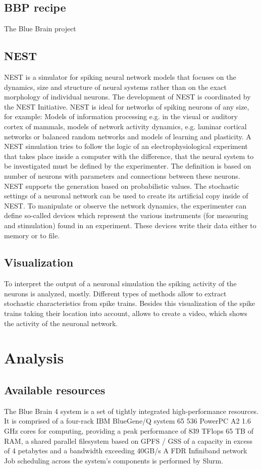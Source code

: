 \documentclass[a4paper]{article}
\begin{document}
\subsection{BBP recipe}
	The Blue Brain project   

\subsection{NEST}
NEST is a simulator for spiking neural network models that focuses on the dynamics, size and structure of neural systems rather than on the exact morphology of individual neurons. The development of NEST is coordinated by the NEST Initiative. NEST is ideal for networks of spiking neurons of any size, for example:
Models of information processing e.g. in the visual or auditory cortex of mammals, models of network activity dynamics, e.g. laminar cortical networks or balanced random networks and models of learning and plasticity. A NEST simulation tries to follow the logic of an electrophysiological experiment that takes place inside a computer with the difference, that the neural system to be investigated must be defined by the experimenter. The definition is based on number of neurons with parameters and connections between these neurons. NEST supports the generation based on probabilistic values. The stochastic settings of a neuronal network can be used to create its artificial copy inside of NEST. To manipulate or observe the network dynamics, the experimenter can define so-called devices which represent the various instruments (for measuring and stimulation) found in an experiment. These devices write their data either to memory or to file. 

\subsection{Visualization}
To interpret the output of a neuronal simulation the spiking activity of the neurons is analyzed, mostly. Different types of methods allow to extract stochastic characteristics from spike trains. Besides this visualization of the spike trains taking their location into account, allows to create a video, which shows the activity of the neuronal network.




\section{Analysis}

\subsection{Available resources}   
The Blue Brain 4 system is a set of tightly integrated high-performance resources. It is comprised of a four-rack IBM BlueGene/Q system 65 536 PowerPC A2 1.6 GHz cores for computing, providing a peak performance of 839 TFlops 65 TB of RAM, a shared parallel filesystem based on GPFS / GSS of a capacity in excess of 4 petabytes and a bandwidth exceeding 40GB/s A FDR Infiniband network Job scheduling across the system's components is performed by Slurm. 
\end{document}
